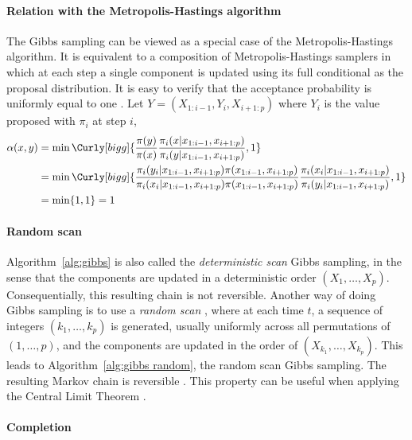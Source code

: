 \paragraph{Relation with the Metropolis-Hastings algorithm}

The Gibbs sampling can be viewed as a special case of the Metropolis-Hastings
algorithm. It is equivalent to a composition of Metropolis-Hastings samplers
in which at each step a single component is updated using its full conditional
as the proposal distribution. It is easy to verify that the acceptance
probability is uniformly equal to one \cite[][Theorem~10.13]{Robert:2004tn}.
Let $Y = (X_{1:i-1},Y_i,X_{i+1:p})$ where $Y_i$ is the value proposed with
$\pi_i$ at step $i$,
\begin{align*}
  \alpha(x,y) &= \min\Curly[bigg]{
    \frac{\pi(y)}{\pi(x)}
    \frac{\pi_i(x|x_{1:i-1},x_{i+1:p})}{\pi_i(y|x_{1:i-1},x_{i+1:p})},1} \\
  &= \min\Curly[bigg]{
    \frac{\pi_i(y_i|x_{1:i-1}, x_{i+1:p})\pi(x_{1:i-1},x_{i+1:p})}
    {\pi_i(x_i|x_{1:i-1}, x_{i+1:p})\pi(x_{1:i-1},x_{i+1:p})}
    \frac{\pi_i(x_i|x_{1:i-1}, x_{i+1:p})}{\pi_i(y_i|x_{1:i-1}, x_{i+1:p})},1}
  \\
  &= \min\{1,1\} = 1
\end{align*}

\paragraph{Random scan}

Algorithm~\ref{alg:gibbs} is also called the \emph{deterministic scan} Gibbs
sampling, in the sense that the components are updated in a deterministic
order $(X_1,\dots,X_p)$. Consequentially, this resulting chain is not
reversible. Another way of doing Gibbs sampling is to use a \emph{random scan}
\cite{Liu1995Gibbs}, where at each time $t$, a sequence of integers
$(k_1,\dots,k_p)$ is generated, usually uniformly across all permutations of
$(1,\dots,p)$, and the components are updated in the order of
$(X_{k_1},\dots,X_{k_p})$. This leads to Algorithm~\ref{alg:gibbs random}, the
random scan Gibbs sampling. The resulting Markov chain is reversible
\cite{Liu1995Gibbs}. This property can be useful when applying the Central
Limit Theorem \cite[][sec.~10.1.2]{Robert:2004tn}.



\paragraph{Completion}

